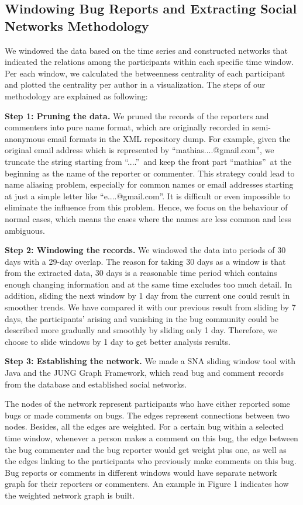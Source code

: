 \documentclass[10pt, conference, compsocconf]{IEEEtran}
\begin{document}
\subsection{Windowing Bug Reports and Extracting Social Networks Methodology}
We windowed the data based on the time series and constructed networks
that indicated the relations among the participants within each specific
time window. Per each window, we calculated the betweenness centrality of each
participant and plotted the centrality per author in a visualization. The steps of our methodology are
explained as following:


\textbf{Step 1: Pruning the data.} We pruned the records of the reporters and commenters into pure name format, which are originally recorded in semi-anonymous email formats in the XML repository dump. For example, given the original email address which is represented by \textquotedblleft mathias....@gmail.com\textquotedblright, we truncate the string starting from \textquotedblleft ....\textquotedblright \ and keep the front part \textquotedblleft mathias\textquotedblright \ at the beginning as the name of the reporter or commenter. This strategy could lead to name aliasing problem, especially for common names or email addresses starting at just a simple letter like \textquotedblleft e....@gmail.com\textquotedblright. It is difficult or even impossible to eliminate the influence from this problem. Hence, we focus on the behaviour of normal cases, which means the cases where the names are less common and less ambiguous.

\textbf{Step 2: Windowing the records.} We windowed the data into periods of 30 days with a 29-day overlap. The reason for taking 30 days as a window is that from the extracted data, 30 days is a reasonable time period which contains enough changing information and at the same time excludes too much detail. In addition, sliding the next window by 1 day from the current one could result in smoother trends. We have compared it with our previous result from sliding by 7 days, the participants' arising and vanishing in the bug community could be described more gradually and smoothly by sliding only 1 day. Therefore, we choose to slide windows by 1 day to get better analysis results.

\textbf{Step 3: Establishing the network.} We made a SNA sliding window tool with Java and the JUNG Graph Framework, which read bug and comment records from the database and established social networks.

The nodes of the network represent participants who have either reported some bugs or made comments on bugs. The edges represent connections between two nodes. Besides, all the edges are weighted. For a certain bug within a selected time window, whenever a person makes a comment on this bug, the edge between the bug commenter and the bug reporter would get weight plus one, as well as the edges linking to the participants who previously make comments on this bug. Bug reports or comments in different windows would have separate network graph for their reporters or commenters. An example in Figure 1 indicates how the weighted network graph is built.
\end{document}
